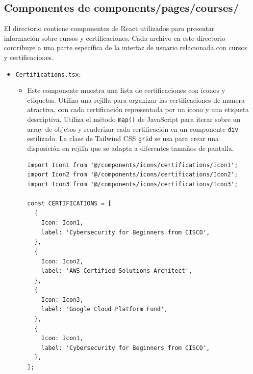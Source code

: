 \subsection{Componentes de components/pages/courses/}
El directorio contiene componentes de React utilizados para presentar información sobre cursos y certificaciones. Cada archivo en este directorio contribuye a una parte específica de la interfaz de usuario relacionada con cursos y certificaciones.
\begin{itemize}
  \item \texttt{Certifications.tsx}:
  \begin{itemize}
    \item Este componente muestra una lista de certificaciones con íconos y etiquetas. Utiliza una rejilla para organizar las certificaciones de manera atractiva, con cada certificación representada por un ícono y una etiqueta descriptiva. Utiliza el método \texttt{map()} de JavaScript para iterar sobre un array de objetos y renderizar cada certificación en un componente \texttt{div} estilizado. La clase de Tailwind CSS \texttt{grid} se usa para crear una disposición en rejilla que se adapta a diferentes tamaños de pantalla.
    \begin{verbatim}
import Icon1 from '@/components/icons/certifications/Icon1';
import Icon2 from '@/components/icons/certifications/Icon2';
import Icon3 from '@/components/icons/certifications/Icon3';

const CERTIFICATIONS = [
  {
    Icon: Icon1,
    label: 'Cybersecurity for Beginners from CISCO',
  },
  {
    Icon: Icon2,
    label: 'AWS Certified Solutions Architect',
  },
  {
    Icon: Icon3,
    label: 'Google Cloud Platform Fund',
  },
  {
    Icon: Icon1,
    label: 'Cybersecurity for Beginners from CISCO',
  },
];


\end{verbatim}
\end{itemize}
\end{itemize}
